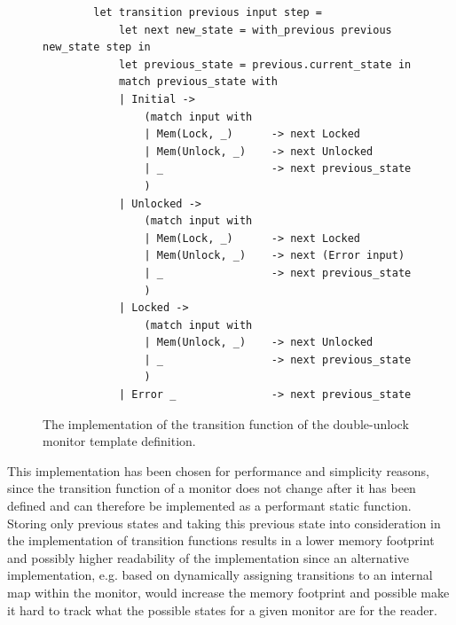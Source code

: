 \begin{figure}[H]
    \centering
    \begin{verbatim}
        let transition previous input step = 
            let next new_state = with_previous previous new_state step in
            let previous_state = previous.current_state in 
            match previous_state with 
            | Initial -> 
                (match input with 
                | Mem(Lock, _)      -> next Locked
                | Mem(Unlock, _)    -> next Unlocked
                | _                 -> next previous_state
                )
            | Unlocked ->
                (match input with 
                | Mem(Lock, _)      -> next Locked
                | Mem(Unlock, _)    -> next (Error input)
                | _                 -> next previous_state
                )
            | Locked ->
                (match input with 
                | Mem(Unlock, _)    -> next Unlocked
                | _                 -> next previous_state
                )
            | Error _               -> next previous_state
    \end{verbatim}
    \caption{The implementation of the transition function of the double-unlock monitor template definition.}
    \label{transition-implementation}
\end{figure}

\newpar This implementation has been chosen for performance and simplicity reasons, since the transition function of a monitor does not change after it has been defined and can therefore be implemented as a performant static function. Storing only previous states and taking this previous state into consideration in the implementation of transition functions results in a lower memory footprint and possibly higher readability of the implementation since an alternative implementation, e.g. based on dynamically assigning transitions to an internal map within the monitor, would increase the memory footprint and possible make it hard to track what the possible states for a given monitor are for the reader.

